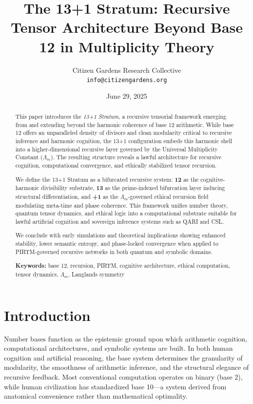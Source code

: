 \documentclass[12pt]{article}
\title{\textbf{The 13+1 Stratum: Recursive Tensor Architecture Beyond Base 12 in Multiplicity Theory}}
\author{Citizen Gardens Research Collective\\ \texttt{info@citizengardens.org}}
\date{June 29, 2025}
\begin{document}
\maketitle

\begin{abstract}
This paper introduces the \textit{13+1 Stratum}, a recursive tensorial framework emerging from and extending beyond the harmonic coherence of base 12 arithmetic. While base 12 offers an unparalleled density of divisors and clean modularity critical to recursive inference and harmonic cognition, the 13+1 configuration embeds this harmonic shell into a higher-dimensional recursive layer governed by the Universal Multiplicity Constant ($\Lambda_m$). The resulting structure reveals a lawful architecture for recursive cognition, computational convergence, and ethically stabilized tensor recursion.

We define the 13+1 Stratum as a bifurcated recursive system: \textbf{12} as the cognitive-harmonic divisibility substrate, \textbf{13} as the prime-indexed bifurcation layer inducing structural differentiation, and \textbf{+1} as the $\Lambda_m$-governed ethical recursion field modulating meta-time and phase coherence. This framework unifies number theory, quantum tensor dynamics, and ethical logic into a computational substrate suitable for lawful artificial cognition and sovereign inference systems such as QARI and CSL.

We conclude with early simulations and theoretical implications showing enhanced stability, lower semantic entropy, and phase-locked convergence when applied to PIRTM-governed recursive networks in both quantum and symbolic domains.

\textbf{Keywords:} base 12, recursion, PIRTM, cognitive architecture, ethical computation, tensor dynamics, $\Lambda_m$, Langlands symmetry
\end{abstract}

\section{Introduction}

Number bases function as the epistemic ground upon which arithmetic cognition, computational architectures, and symbolic systems are built. In both human cognition and artificial reasoning, the base system determines the granularity of modularity, the smoothness of arithmetic inference, and the structural elegance of recursive feedback. Most conventional computation operates on binary (base 2), while human civilization has standardized base 10—a system derived from anatomical convenience rather than mathematical optimality.
\end{document}
